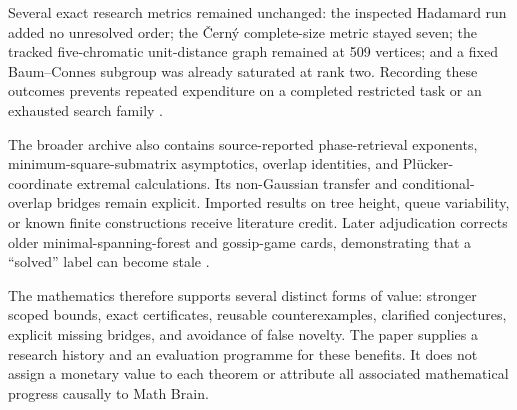 Several exact research metrics remained unchanged: the inspected Hadamard run added no unresolved order; the \v Cern\'y complete-size metric stayed seven; the tracked five-chromatic unit-distance graph remained at 509 vertices; and a fixed Baum--Connes subgroup was already saturated at rank two. Recording these outcomes prevents repeated expenditure on a completed restricted task or an exhausted search family \citep{CaseHadamard2026,CaseCerny2026,CaseHadwigerNelson2026,CaseBaumConnes2026}.

The broader archive also contains source-reported phase-retrieval exponents, minimum-square-submatrix asymptotics, overlap identities, and Pl\"ucker-coordinate extremal calculations. Its non-Gaussian transfer and conditional-overlap bridges remain explicit. Imported results on tree height, queue variability, or known finite constructions receive literature credit. Later adjudication corrects older minimal-spanning-forest and gossip-game cards, demonstrating that a ``solved'' label can become stale \citep{CaseBroadSolvedRegister2026,CaseCampaignIndex2026,CaseW7Adjudication2026}.

The mathematics therefore supports several distinct forms of value: stronger scoped bounds, exact certificates, reusable counterexamples, clarified conjectures, explicit missing bridges, and avoidance of false novelty. The paper supplies a research history and an evaluation programme for these benefits. It does not assign a monetary value to each theorem or attribute all associated mathematical progress causally to Math Brain.
